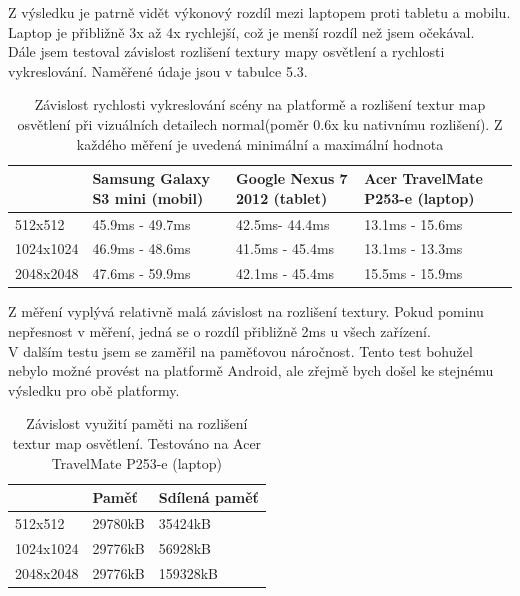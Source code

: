\documentclass[11pt,twoside,a4paper]{book}
\begin{document}
Z výsledku je patrně vidět výkonový rozdíl mezi laptopem proti tabletu a mobilu. Laptop je přibližně 3x až 4x rychlejší, což je menší rozdíl než jsem očekával.
\\

Dále jsem testoval závislost rozlišení textury mapy osvětlení a rychlosti vykreslování. Naměřené údaje jsou v tabulce 5.3.

\begin{table}[h!]
\begin{center}
\begin{tabular}{|p{35mm}|p{35mm}|p{35mm}|p{35mm}|}
\hline
& \textbf{Samsung Galaxy S3 mini (mobil)} & \textbf{Google Nexus 7 2012 (tablet)} & \textbf{Acer TravelMate P253-e (laptop)} \\
\hline
512x512 & 45.9ms - 49.7ms & 42.5ms- 44.4ms & 13.1ms - 15.6ms \\ \hline
1024x1024 & 46.9ms - 48.6ms & 41.5ms - 45.4ms & 13.1ms - 13.3ms \\ \hline
2048x2048 & 47.6ms - 59.9ms & 42.1ms - 45.4ms & 15.5ms - 15.9ms \\ \hline
\end{tabular}
\caption{Závislost rychlosti vykreslování scény na platformě a rozlišení textur map osvětlení při vizuálních detailech normal(poměr 0.6x ku nativnímu rozlišení). Z každého měření je uvedená minimální a maximální hodnota}
\end{center}
\end{table}

Z měření vyplývá relativně malá závislost na rozlišení textury. Pokud pominu nepřesnost v měření, jedná se o rozdíl přibližně 2ms u všech zařízení.
\\

V dalším testu jsem se zaměřil na paměťovou náročnost. Tento test bohužel nebylo možné provést na platformě Android, ale zřejmě bych došel ke stejnému výsledku pro obě platformy.

\begin{table}[h!]
\begin{center}
\begin{tabular}{|p{35mm}|p{35mm}|p{35mm}|}
\hline
& \textbf{Paměť} & \textbf{Sdílená paměť} \\
\hline
512x512 & 29780kB & 35424kB \\ \hline
1024x1024 & 29776kB & 56928kB \\ \hline
2048x2048 & 29776kB & 159328kB \\ \hline
\end{tabular}
\caption{Závislost využití paměti na rozlišení textur map osvětlení. Testováno na Acer TravelMate P253-e (laptop)}
\end{center}
\end{table}
\pagebreak
\end{document}

